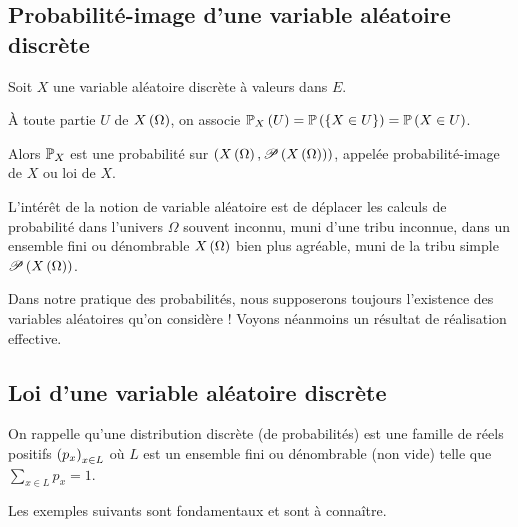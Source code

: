 \subsection{Probabilité-image d'une variable aléatoire discrète}

\begin{prop}
Soit \(X\) une variable aléatoire discrète à valeurs dans \(E\).

À toute partie \(U\) de \(X\paren{\Omega}\), on associe \(\probacond{U}{X}=\proba{\accol{X\in U}}=\proba{X\in U}\).

Alors \(\prem_X\) est une probabilité sur \(\groupe{X\paren{\Omega}}[\P{X\paren{\Omega}}]\), appelée probabilité-image de \(X\) ou loi de \(X\).
\end{prop}

\begin{rem}
L'intérêt de la notion de variable aléatoire est de déplacer les calculs de probabilité dans l'univers \(\Omega\) souvent inconnu, muni d'une tribu inconnue, dans un ensemble fini ou dénombrable \(X\paren{\Omega}\) bien plus agréable, muni de la tribu simple \(\P{X\paren{\Omega}}\).

Dans notre pratique des probabilités, nous supposerons toujours l'existence des variables aléatoires qu'on considère ! Voyons néanmoins un résultat de réalisation effective.
\end{rem}

\subsection{Loi d'une variable aléatoire discrète}

On rappelle qu'une distribution discrète (de probabilités) est une famille de réels positifs \(\paren{p_x}_{x\in L}\) où \(L\) est un ensemble fini ou dénombrable (non vide) telle que \(\sum_{x\in L}p_x=1\).

Les exemples suivants sont fondamentaux et sont à connaître.

